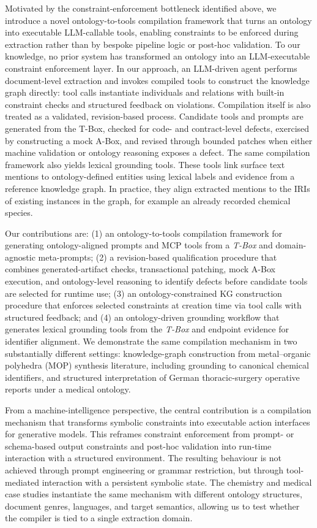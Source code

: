 Motivated by the constraint-enforcement bottleneck identified above, we introduce a novel ontology-to-tools compilation framework that turns an ontology into executable LLM-callable tools, enabling constraints to be enforced during extraction rather than by bespoke pipeline logic or post-hoc validation. To our knowledge, no prior system has transformed an ontology into an LLM-executable constraint enforcement layer. In our approach, an LLM-driven agent performs document-level extraction and invokes compiled tools to construct the knowledge graph directly: tool calls instantiate individuals and relations with built-in constraint checks and structured feedback on violations. Compilation itself is also treated as a validated, revision-based process. Candidate tools and prompts are generated from the T-Box, checked for code- and contract-level defects, exercised by constructing a mock A-Box, and revised through bounded patches when either machine validation or ontology reasoning exposes a defect. The same compilation framework also yields lexical grounding tools. These tools link surface text mentions to ontology-defined entities using lexical labels and evidence from a reference knowledge graph. In practice, they align extracted mentions to the IRIs of existing instances in the graph, for example an already recorded chemical species.

Our contributions are: (1) an ontology-to-tools compilation framework for generating ontology-aligned prompts and MCP tools from a \emph{T-Box} and domain-agnostic meta-prompts; (2) a revision-based qualification procedure that combines generated-artifact checks, transactional patching, mock A-Box execution, and ontology-level reasoning to identify defects before candidate tools are selected for runtime use; (3) an ontology-constrained KG construction procedure that enforces selected constraints at creation time via tool calls with structured feedback; and (4) an ontology-driven grounding workflow that generates lexical grounding tools from the \emph{T-Box} and endpoint evidence for identifier alignment. We demonstrate the same compilation mechanism in two substantially different settings: knowledge-graph construction from metal--organic polyhedra (MOP) synthesis literature, including grounding to canonical chemical identifiers, and structured interpretation of German thoracic-surgery operative reports under a medical ontology.

From a machine-intelligence perspective, the central contribution is a compilation mechanism that transforms symbolic constraints into executable action interfaces for generative models. This reframes constraint enforcement from prompt- or schema-based output constraints and post-hoc validation into run-time interaction with a structured environment. The resulting behaviour is not achieved through prompt engineering or grammar restriction, but through tool-mediated interaction with a persistent symbolic state. The chemistry and medical case studies instantiate the same mechanism with different ontology structures, document genres, languages, and target semantics, allowing us to test whether the compiler is tied to a single extraction domain.


